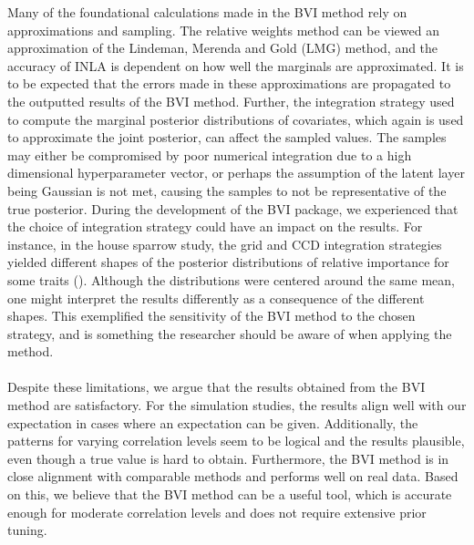 Many of the foundational calculations made in the BVI method rely on approximations and sampling. The relative weights method can be viewed an approximation of the Lindeman, Merenda and Gold (LMG) method, and the accuracy of INLA is dependent on how well the marginals are approximated. It is to be expected that the errors made in these approximations are propagated to the outputted results of the BVI method. Further, the integration strategy used to compute the marginal posterior distributions of covariates, which again is used to approximate the joint posterior, can affect the sampled values. The samples may either be compromised by poor numerical integration due to a high dimensional hyperparameter vector, or perhaps the assumption of the latent layer being Gaussian is not met, causing the samples to not be representative of the true posterior. During the development of the BVI package, we experienced that the choice of integration strategy could have an impact on the results. For instance, in the house sparrow study, the grid and CCD integration strategies yielded different shapes of the posterior distributions of relative importance for some traits (). Although the distributions were centered around the same mean, one might interpret the results differently as a consequence of the different shapes. This exemplified the sensitivity of the BVI method to the chosen strategy, and is something the researcher should be aware of when applying the method. 
\\
\\
Despite these limitations, we argue that the results obtained from the BVI method are satisfactory. For the simulation studies, the results align well with our expectation in cases where an expectation can be given. Additionally, the patterns for varying correlation levels seem to be logical and the results plausible, even though a true value is hard to obtain. Furthermore, the BVI method is in close alignment with comparable methods and performs well on real data. Based on this, we believe that the BVI method can be a useful tool, which is accurate enough for moderate correlation levels and does not require extensive prior tuning.
\\
\\
